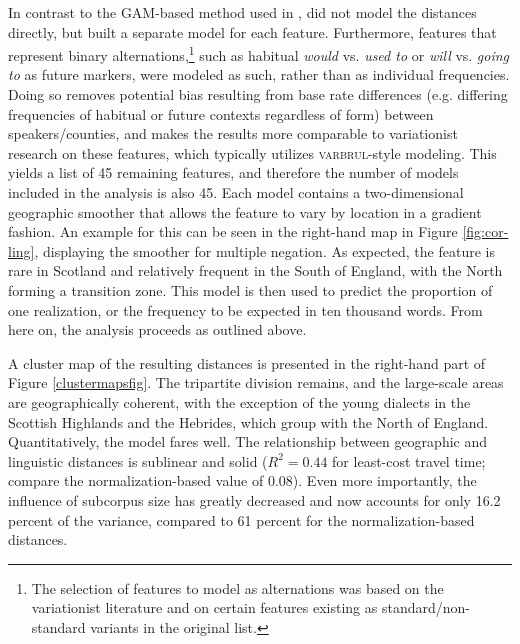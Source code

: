 \documentclass[output=paper]{LSP/langsci}
\begin{document}
In contrast to the GAM-based method used in \citet{wieling_quantitative_2012}, \citet{wolk_integrating_2014} did not model the distances directly, but built a separate model for each feature.
Furthermore, features that represent binary alternations,\footnote{The selection of features to model as alternations was based on the variationist literature and on certain features existing as standard/non-standard variants in the original list.} such as habitual \emph{would} vs. \emph{used to} or \emph{will} vs. \emph{going to} as future markers, were modeled as such, rather than as individual frequencies.
Doing so removes potential bias resulting from base rate differences (e.g. differing frequencies of habitual or future contexts regardless of form) between speakers/counties, and makes the results more comparable to variationist research on these features, which typically utilizes \textsc{varbrul}-style modeling.
This yields a list of 45 remaining features, and therefore the number of models included in the analysis is also 45.
Each model contains a two-dimensional geographic smoother that allows the feature to vary by location in a gradient fashion.
An example for this can be seen in the right-hand map in Figure \ref{fig:cor-ling}, displaying the smoother for multiple negation.
As expected, the feature is rare in Scotland and relatively frequent in the South of England, with the North forming a transition zone.
This model is then used to predict the proportion of one realization, or the frequency to be expected in ten thousand words.
From here on, the analysis proceeds as outlined above.

A cluster map of the resulting distances is presented in the right-hand part of Figure \ref{clustermapsfig}. 
The tripartite division remains, and the large-scale areas are geographically coherent, with the exception of the young dialects in the Scottish Highlands and the Hebrides, which group with the North of England.
Quantitatively, the model fares well. The relationship between geographic and linguistic distances is sublinear and solid ($R^2 = 0.44$ for least-cost travel time; compare the normalization-based value of $0.08$).
Even more importantly, the influence of subcorpus size has greatly decreased and now accounts for only 16.2 percent of the variance, compared to 61 percent for the normalization-based distances.
\end{document}
